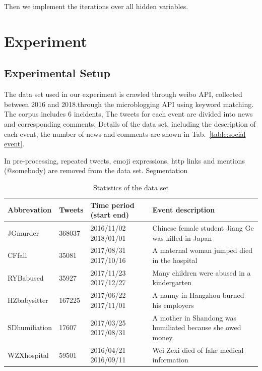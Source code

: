 \documentclass[runningheads]{llncs}
\begin{document}
Then we implement the iterations over all hidden variables.

\section{Experiment}\label{sec:Experiment}
\subsection{Experimental Setup}
The data set used in our experiment is crawled through weibo API, collected between 2016 and 2018.through the microblogging API using keyword matching. %
The corpus includes 6 incidents, %
 The tweets for each event are divided into news and corresponding comments. Details of the data set, including the description of each event, the number of news and comments are shown in Tab.~\ref{table:social event}.

In pre-processing, repeated tweets, emoji expressions, http links and mentions (@somebody) are removed from the data set.
Segmentation %

\begin{table}[ht]
\caption{Statistics of the data set}\label{table:social event}
\begin{center}
\tiny
\begin{tabular}{|l|l|l|l|}
\hline
Abbrevation   & Tweets & Time period (start end) & Event description                                           \\ \hline
JGmurder      & 368037 & 2016/11/02 2018/01/01   & Chinese female student Jiang Ge was killed in Japan         \\ \hline
CFfall        & 35081  & 2017/08/31 2017/10/16   & A maternal woman jumped died in the hospital                \\ \hline
RYBabused     & 35927  & 2017/11/23 2017/12/27   & Many children were abused in a kindergarten                 \\ \hline
HZbabysitter  & 167225 & 2017/06/22 2017/11/01   & A nanny in Hangzhou burned his employers                    \\ \hline
SDhumiliation & 17607  & 2017/03/25 2017/08/31   & A mother in Shandong was humiliated because she owed money. \\ \hline
WZXhospital   & 59501  & 2016/04/21 2016/09/11   & Wei Zexi died of fake medical information                   \\ \hline
\end{tabular}
\end{center}
\label{default}
\end{table}
\end{document}

